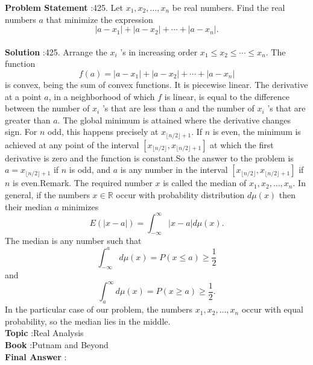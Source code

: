 \documentclass[10pt]{article}
\begin{document}
\textbf{Problem Statement} :425. Let $x_{1}, x_{2}, \ldots, x_{n}$ be real numbers. Find the real numbers $a$ that minimize the expression$$ \left|a-x_{1}\right|+\left|a-x_{2}\right|+\cdots+\left|a-x_{n}\right| . $$\\
\textbf{Solution} :425. Arrange the $x_{i}$ 's in increasing order $x_{1} \leq x_{2} \leq \cdots \leq x_{n}$. The function$$ f(a)=\left|a-x_{1}\right|+\left|a-x_{2}\right|+\cdots+\left|a-x_{n}\right| $$is convex, being the sum of convex functions. It is piecewise linear. The derivative at a point $a$, in a neighborhood of which $f$ is linear, is equal to the difference between the number of $x_{i}$ 's that are less than $a$ and the number of $x_{i}$ 's that are greater than $a$. The global minimum is attained where the derivative changes sign. For $n$ odd, this happens precisely at $x_{\lfloor n / 2\rfloor+1}$. If $n$ is even, the minimum is achieved at any point of the interval $\left[x_{\lfloor n / 2\rfloor}, x_{\lfloor n / 2\rfloor+1}\right]$ at which the first derivative is zero and the function is constant.So the answer to the problem is $a=x_{\lfloor n / 2\rfloor+1}$ if $n$ is odd, and $a$ is any number in the interval $\left[x_{\lfloor n / 2\rfloor}, x_{\lfloor n / 2\rfloor+1}\right]$ if $n$ is even.Remark. The required number $x$ is called the median of $x_{1}, x_{2}, \ldots, x_{n}$. In general, if the numbers $x \in \mathbb{R}$ occur with probability distribution $d \mu(x)$ then their median $a$ minimizes$$ E(|x-a|)=\int_{-\infty}^{\infty}|x-a| d \mu(x) . $$The median is any number such that$$ \int_{-\infty}^{a} d \mu(x)=P(x \leq a) \geq \frac{1}{2} $$and$$ \int_{a}^{\infty} d \mu(x)=P(x \geq a) \geq \frac{1}{2} . $$In the particular case of our problem, the numbers $x_{1}, x_{2}, \ldots, x_{n}$ occur with equal probability, so the median lies in the middle.\\
\textbf{Topic} :Real Analysis\\
\textbf{Book} :Putnam and Beyond\\
\textbf{Final Answer} :\\
\end{document}
